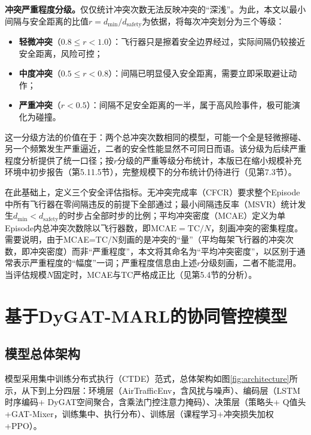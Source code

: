 \documentclass[12pt,a4paper,UTF8]{ctexart}
\begin{document}
\textbf{冲突严重程度分级。}仅仅统计冲突次数无法反映冲突的“深浅”。为此，本文以最小间隔与安全距离的比值$r=d_{\min}/d_{\text{safety}}$为依据，将每次冲突划分为三个等级：
\begin{itemize}
    \item \textbf{轻微冲突}（$0.8\leq r<1.0$）：飞行器只是擦着安全边界经过，实际间隔仍较接近安全距离，风险可控；
    \item \textbf{中度冲突}（$0.5\leq r<0.8$）：间隔已明显侵入安全距离，需要立即采取避让动作；
    \item \textbf{严重冲突}（$r<0.5$）：间隔不足安全距离的一半，属于高风险事件，极可能演化为碰撞。
\end{itemize}

这一分级方法的价值在于：两个总冲突次数相同的模型，可能一个全是轻微擦碰、另一个频繁发生严重逼近，二者的安全性能显然不可同日而语。该分级为后续严重程度分析提供了统一口径；按$r$分级的严重等级分布统计，本版已在缩小规模补充环境中初步报告（第5.11.5节），完整规模下的分布统计仍待进行（见第7.3节）。

在此基础上，定义三个安全评估指标。无冲突完成率（CFCR）要求整个Episode中所有飞行器在零间隔违反的前提下全部通过；最小间隔违反率（MSVR）统计发生$d_{\min}<d_{\text{safety}}$的时步占全部时步的比例；平均冲突密度（MCAE）定义为单Episode内总冲突次数除以飞行器数，即$\mathrm{MCAE}=\mathrm{TC}/N$，刻画冲突的密集程度。需要说明，由于MCAE=TC/N刻画的是冲突的“量”（平均每架飞行器的冲突次数，即冲突密度）而非“严重程度”，本文将其命名为“平均冲突密度”，以区别于通常表示严重程度的“幅度”一词；严重程度信息由上述$r$分级刻画，二者不能混用。当评估规模$N$固定时，MCAE与TC严格成正比（见第5.4节的分析）。

\section{基于DyGAT-MARL的协同管控模型}

\subsection{模型总体架构}

模型采用集中训练分布式执行（CTDE）范式，总体架构如图\ref{fig:architecture}所示，从下到上分四层：环境层（AirTrafficEnv，含风扰与噪声）、编码层（LSTM时序编码+ DyGAT空间聚合，含乘法门控注意力掩码）、决策层（策略头+ Q值头+GAT-Mixer，训练集中、执行分布）、训练层（课程学习+冲突损失加权+PPO）。
\end{document}
